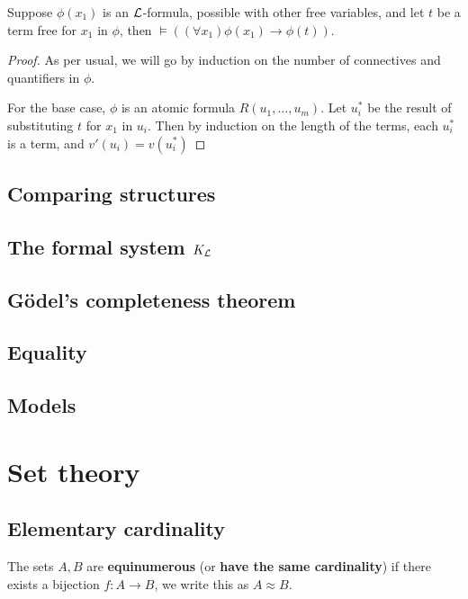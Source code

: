 \documentclass{article}
\begin{document}
\begin{theorem}
    Suppose $\phi(x_1)$ is an $\mathcal{L}$-formula, possible with other free variables, and let $t$ be a term free for $x_1$ in $\phi$, then $\vDash((\forall x_1)\phi(x_1)\rightarrow\phi(t))$.
    \begin{proof}
        As per usual, we will go by induction on the number of connectives and quantifiers in $\phi$.

        For the base case, $\phi$ is an atomic formula $R(u_1,\ldots,u_m)$. Let $u_i^*$ be the result of substituting $t$ for $x_1$ in $u_i$. Then by induction on the length of the terms, each $u_i^*$ is a term, and $v'(u_i)=v(u_i^*)$
    \end{proof}
\end{theorem}

\newpage

\subsection{Comparing structures}

\subsection{The formal system $K_{\mathcal{L}}$}

\subsection{G\"odel's completeness theorem}

\subsection{Equality}

\subsection{Models}

\section{Set theory}

\subsection{Elementary cardinality}

\begin{definition}
    The sets $A,B$ are \textbf{equinumerous} (or \textbf{have the same cardinality}) if there exists a bijection $f:A\rightarrow B$, we write this as $A\approx B$.
\end{definition}
\end{document}
